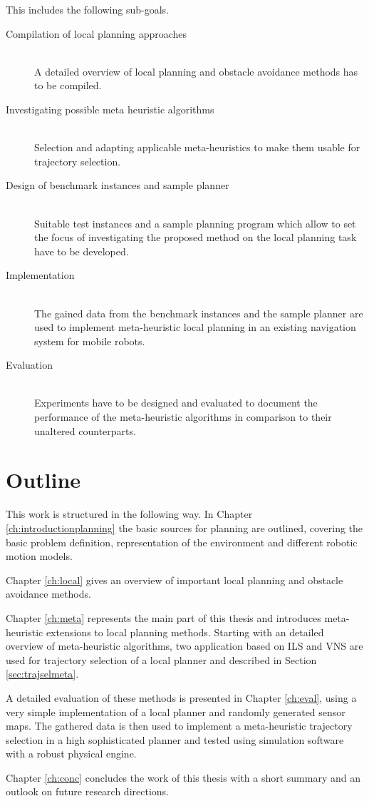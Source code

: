 This includes the following sub-goals.
\begin{description}
\item[Compilation of local planning approaches]\hfill \\
A detailed overview of local planning and obstacle avoidance methods has to be compiled. 
\item[Investigating possible meta heuristic algorithms]\hfill \\
Selection and adapting applicable meta-heuristics to make them usable for trajectory selection.
\item[Design of benchmark instances and sample planner]\hfill \\
Suitable test instances and a sample planning program which allow to set the focus of investigating the proposed method on the local planning task have to be developed.  
\item[Implementation]\hfill \\
The gained data from the benchmark instances and the sample planner are used to implement meta-heuristic local planning in an existing navigation system for mobile robots.  
\item[Evaluation]\hfill \\
Experiments have to be designed and evaluated to document the performance of the meta-heuristic algorithms in comparison to their unaltered counterparts.
\end{description}

\section{Outline}\label{sec:outline}
This work is structured in the following way. 
In Chapter \ref{ch:introductionplanning} the basic sources for planning are outlined, covering the basic problem definition, representation of the environment and different robotic motion models. 

Chapter \ref{ch:local} gives an overview of important local planning and obstacle avoidance methods.
 
Chapter \ref{ch:meta} represents the main part of this thesis and introduces meta-heuristic extensions to local planning methods. 
Starting with an detailed overview of  meta-heuristic algorithms, two application based on ILS and VNS are used for trajectory selection of a local planner and described in Section \ref{sec:trajselmeta}.

A detailed evaluation of these methods is presented in Chapter \ref{ch:eval}, using a very simple implementation of a local planner and randomly generated sensor maps. 
The gathered data is then used to implement a meta-heuristic trajectory selection in a high sophisticated planner and tested using simulation software with a robust physical engine.

Chapter \ref{ch:conc} concludes the work of this thesis with a short summary and an outlook on future research directions.




